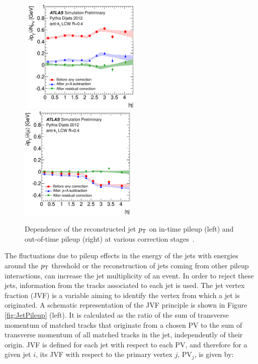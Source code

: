 \begin{figure}[!ht]
  \begin{center}
    \mbox{
      \includegraphics[width=0.495\textwidth]{ObjectReconstruction/Figures/JetPileupCorrNPV.eps}
      \includegraphics[width=0.495\textwidth]{ObjectReconstruction/Figures/JetPileupCorrMu.eps}
    }
  \end{center}
  \caption[Dependence of the reconstructed jet $\pt$ on in-time pileup and out-of-time pileup at various correction stages.]{Dependence of the reconstructed jet $\pt$ on in-time pileup (left) and out-of-time pileup (right) at various correction stages~\protect\cite{TheATLAScollaboration:2013pia}.}
  \label{fig:JetPileupCorrection}
\end{figure}

The fluctuations due to pileup effects in the energy of the jets with energies around the $\pt$ threshold or the reconstruction of jets coming from other pileup interactions, can increase the jet multiplicity of an event.
In order to reject these jets, information from the tracks associated to each jet is used.
The jet vertex fraction (JVF) is a variable aiming to identify the vertex from which a jet is originated. 
A schematic representation of the JVF principle is shown in Figure \ref{fig:JetPileup} (left).
It is calculated as the ratio of the sum of transverse momentum of matched tracks that originate from a chosen PV to the sum of transverse momentum of all matched tracks in the jet, independently of their origin. 
JVF is defined for each jet with respect to each PV, and therefore for a given jet $i$, its JVF with respect to the primary vertex $j$, PV$_j$, is given by:

